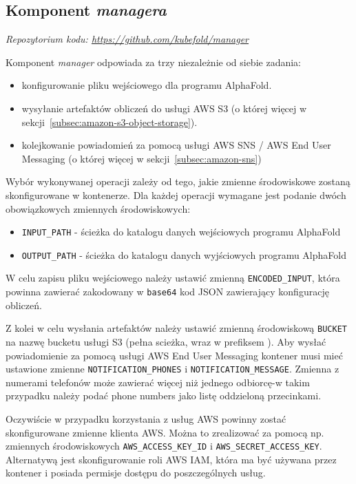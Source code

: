 \subsection{Komponent \textit{managera}}\label{subsec:component-manager}
\textit{Repozytorium kodu: \url{https://github.com/kubefold/manager}}

Komponent \textit{manager} odpowiada za trzy niezależnie od siebie zadania:
\begin{itemize}
    \item konfigurowanie pliku wejściowego  dla programu AlphaFold.
    \item wysyłanie artefaktów obliczeń do usługi AWS S3 (o której więcej w sekcji~\ref{subsec:amazon-s3-object-storage}).
    \item kolejkowanie powiadomień za pomocą usługi AWS SNS / AWS End User Messaging (o której więcej w sekcji~\ref{subsec:amazon-sns})
\end{itemize}

Wybór wykonywanej operacji zależy od tego, jakie zmienne środowiskowe zostaną skonfigurowane w kontenerze.
Dla każdej operacji wymagane jest podanie dwóch obowiązkowych zmiennych środowiskowych:
\begin{itemize}
    \item \texttt{INPUT\_PATH} - ścieżka do katalogu danych wejściowych programu AlphaFold
    \item \texttt{OUTPUT\_PATH} - ścieżka do katalogu danych wyjściowych programu AlphaFold
\end{itemize}

W celu zapisu pliku wejściowego  należy ustawić zmienną \texttt{ENCODED\_INPUT}, która powinna zawierać zakodowany w \texttt{base64} kod JSON zawierający konfigurację obliczeń.

Z kolei w celu wysłania artefaktów należy ustawić zmienną środowiskową \texttt{BUCKET} na nazwę bucketu usługi S3 (pełna scieżka, wraz w prefiksem ).
Aby wysłać powiadomienie za pomocą usługi AWS End User Messaging kontener musi mieć ustawione zmienne \texttt{NOTIFICATION\_PHONES} i \texttt{NOTIFICATION\_MESSAGE}.
Zmienna z numerami telefonów może zawierać więcej niż jednego odbiorcę-w takim przypadku należy podać phone numbers jako listę oddzieloną przecinkami.

Oczywiście w przypadku korzystania z usług AWS powinny zostać skonfigurowane zmienne klienta AWS. Można to zrealizować za pomocą np. zmiennych środowiskowych \texttt{AWS\_ACCESS\_KEY\_ID} i \texttt{AWS\_SECRET\_ACCESS\_KEY}.
Alternatywą jest skonfigurowanie roli AWS IAM, która ma być używana przez kontener i posiada permisje dostępu do poszczególnych usług.